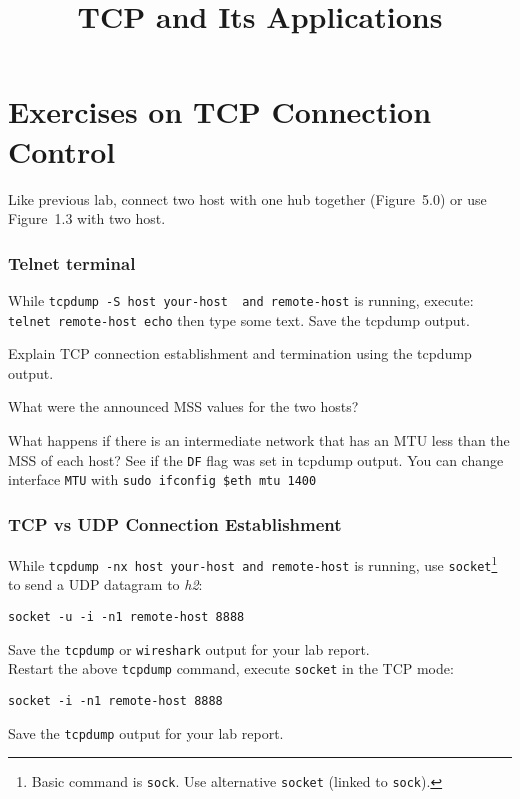 \documentclass{../UTNetLab}
\title{TCP and Its Applications}
\begin{document}
\part{Exercises on TCP Connection Control}
    Like previous lab, connect two host with one hub together (Figure~5.0) or use Figure~1.3 with two host.

\section{Telnet terminal}
    While \lstinline[emph={your-host, remote-host}]{tcpdump -S host your-host  and remote-host} is running, execute: \lstinline[emph={your-host, remote-host}]{telnet remote-host echo} then type some text.
    Save the tcpdump output.
    
    \begin{report}
    \item Explain TCP connection establishment and termination using the tcpdump output.
    
    \item What were the announced MSS values for the two hosts?
    
    \item What happens if there is an intermediate network that has an MTU less than the MSS of each host?
    See if the \texttt{DF} flag was set in tcpdump output.
    You can change interface \texttt{MTU} with \lstinline[emph=$eth]{sudo ifconfig $eth mtu 1400}
    \end{report}
    
\section{TCP vs UDP Connection Establishment}
    While \lstinline[emph={your-host, remote-host}]{tcpdump -nx host your-host and remote-host} is running, use \lstinline{socket}\footnote{Basic command is \lstinline{sock}. Use alternative \lstinline{socket} (linked to \lstinline{sock}).} to send a UDP datagram to \textit{h2}:
    \begin{lstlisting}[emph={your-host, remote-host}]
socket -u -i -n1 remote-host 8888
    \end{lstlisting}
    {Save} the \lstinline{tcpdump} or \lstinline{wireshark} output for your lab report. \\
    Restart the above \lstinline{tcpdump} command, execute \lstinline{socket} in the TCP mode:
    \begin{lstlisting}[emph={remote-host}]
socket -i -n1 remote-host 8888
    \end{lstlisting}
    {Save} the \lstinline{tcpdump} output for your lab report.
    
\end{document}
